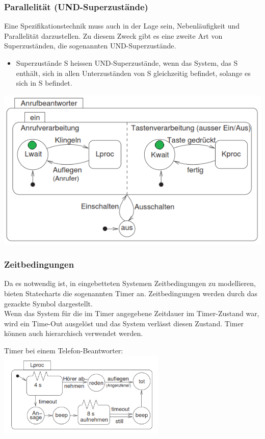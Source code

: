 \subsubsection{Parallelität (UND-Superzustände)}
\begin{multicols}{2}
  Eine Spezifikationstechnik muss auch in der Lage sein, Nebenläufigkeit und Parallelität darzustellen. Zu diesem Zweck gibt es eine zweite Art von Superzuständen, die sogenannten UND-Superzustände.
  \begin{itemize}
    \item Superzustände S heissen UND-Superzustände, wenn das System, das S enthält, sich in allen Unterzuständen von S gleichzeitig befindet,
          solange es sich in S befindet.
  \end{itemize}
  \vfill\null
  \columnbreak
  \begin{center}
    \includegraphics[width=0.8\linewidth]{images/FSM/AND_super_state}
  \end{center}
\end{multicols}

\subsubsection{Zeitbedingungen}
\begin{multicols}{2}
  Da es notwendig ist, in eingebetteten Systemen Zeitbedingungen zu modellieren, bieten Statecharts die sogenannten Timer an. Zeitbedingungen werden durch das gezackte Symbol dargestellt.\\
  Wenn das System für die im Timer angegebene Zeitdauer im Timer-Zustand war, wird ein Time-Out ausgelöst und das System verlässt diesen Zustand. Timer können auch hierarchisch verwendet werden.\\
  \vfill\null
  \begin{center}
    \columnbreak
    Timer bei einem Telefon-Beantworter:\\
    \includegraphics[width=8cm]{images/FSM/timer}
  \end{center}
\end{multicols}
\newpage
